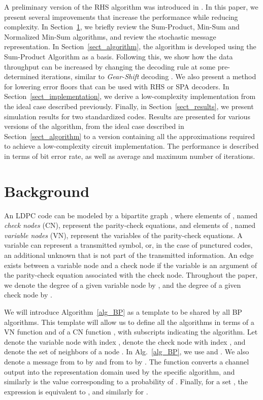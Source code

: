 \documentclass[12pt,journal,twoside,draftcls,onecolumn]{IEEEtran}
\begin{document}
A preliminary version of the RHS algorithm was introduced in \cite{leduc-primeau:2009}. In this paper, we present several improvements that increase the performance while reducing complexity.
In Section~\ref{sect_background}, we briefly review the Sum-Product, Min-Sum and Normalized Min-Sum algorithms, and review the stochastic message representation.
In Section~\ref{sect_algorithm}, the algorithm is developed using the Sum-Product Algorithm as a basis. Following this, we show how the data throughput can be increased by changing the decoding rule at some pre-determined iterations, similar to \emph{Gear-Shift} decoding \cite{ardakani:2006}. We also present a method for lowering error floors that can be used with RHS or SPA decoders.
In Section~\ref{sect_implementation}, we derive a low-complexity implementation from the ideal case described previously.
Finally, in Section~\ref{sect_results}, we present simulation results for two standardized codes.
Results are presented for various versions of the algorithm, from the ideal case described in Section~\ref{sect_algorithm} to a version containing all the approximations required to achieve a low-complexity circuit implementation. The performance is described in terms of bit error rate, as well as average and maximum number of iterations.


\section{Background}
\label{sect_background}

An LDPC code can be modeled by a bipartite graph , where elements of , named \emph{check nodes} (CN), represent the parity-check equations, and elements of , named \emph{variable nodes} (VN), represent the variables of the parity-check equations. A variable can represent a transmitted symbol, or, in the case of punctured codes, an additional unknown that is not part of the transmitted information. An edge exists between a variable node and a check node if the variable is an argument of the parity-check equation associated with the check node. 
Throughout the paper, we denote the degree of a given variable node by , and the degree of a given check node by .

We will introduce Algorithm~\ref{alg_BP} as a template to be shared by all BP algorithms. This template will allow us to define all the algorithms in terms of a VN function  and of a CN function , with subscripts indicating the algorithm.
Let  denote the variable node with index ,  denote the check node with index , and  denote the set of neighbors of a node . In Alg.~\ref{alg_BP}, we use  and . We also denote a message from  to  by  and from  to  by . The  function converts a channel output  into the representation domain used by the specific algorithm, and similarly  is the value corresponding to a probability of .
Finally, for a set , the expression  is equivalent to , and similarly for .
\end{document}
